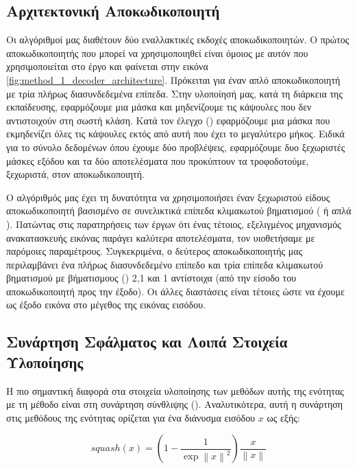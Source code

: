 \subsection{Αρχιτεκτονική Αποκωδικοποιητή}

Οι αλγόριθμοί μας διαθέτουν δύο εναλλακτικές εκδοχές αποκωδικοποιητών. Ο πρώτος αποκωδικοποιητής που μπορεί να χρησιμοποιηθεί είναι όμοιος με αυτόν που χρησιμοποιείται στο έργο \cite{sabour2017dynamic} και φαίνεται στην εικόνα \ref{fig:method_1_decoder_architecture}. Πρόκειται για έναν απλό αποκωδικοποιητή με τρία πλήρως διασυνδεδεμένα επίπεδα. Στην υλοποίησή μας, κατά τη διάρκεια της εκπαίδευσης, εφαρμόζουμε μια μάσκα και μηδενίζουμε τις κάψουλες που δεν αντιστοιχούν στη σωστή κλάση. Κατά τον έλεγχο () εφαρμόζουμε μια μάσκα που εκμηδενίζει όλες τις κάψουλες εκτός από αυτή που έχει το μεγαλύτερο μήκος. Ειδικά για το σύνολο δεδομένων  όπου έχουμε δύο προβλέψεις, εφαρμόζουμε δυο ξεχωριστές μάσκες εξόδου και τα δύο αποτελέσματα που προκύπτουν τα τροφοδοτούμε, ξεχωριστά, στον αποκωδικοποιητή.\par

Ο αλγόριθμός μας έχει τη δυνατότητα να χρησιμοποιήσει έναν ξεχωριστού είδους αποκωδικοποιητή βασισμένο σε συνελικτικά επίπεδα κλιμακωτού βηματισμού ( ή απλά ). Πατώντας στις παρατηρήσεις των έργων \cite{shiri2020quick,liu2019fsc,luo2020capsnet} ότι ένας τέτοιος, εξελιγμένος μηχανισμός ανακατασκευής εικόνας παράγει καλύτερα αποτελέσματα, τον υιοθετήσαμε με παρόμοιες παραμέτρους. Συγκεκριμένα, ο δεύτερος αποκωδικοποιητής μας περιλαμβάνει ένα πλήρως διασυνδεδεμένο επίπεδο και τρία επίπεδα κλιμακωτού βηματισμού με βήματισμους () 2,1 και 1 αντίστοιχα (από την είσοδο του αποκωδικοποιητή προς την έξοδο). Οι άλλες διαστάσεις είναι τέτοιες ώστε να έχουμε ως έξοδο εικόνα στο μέγεθος της εικόνας εισόδου.

\subsection{Συνάρτηση Σφάλματος και Λοιπά Στοιχεία Υλοποίησης}
Η πιο σημαντική διαφορά στα στοιχεία υλοποίησης των μεθόδων αυτής της ενότητας με τη μέθοδο \cite{sabour2017dynamic} είναι στη συνάρτηση σύνθλιψης (). Αναλυτικότερα, αυτή η συνάρτηση στις μεθόδους της ενότητας ορίζεται για ένα διάνυσμα εισόδου $x$ ως εξής\cite{mazzia2021efficient}:

\begin{equation}
    squash(x) = (1 - \frac{1}{\exp{\left\lVert x\right\rVert^2}}) \frac{x}{\left\lVert x\right\rVert}
\end{equation}

